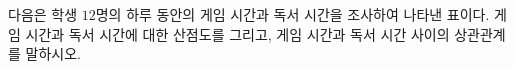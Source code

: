다음은 학생 $12$명의 하루 동안의 게임 시간과 독서 시간을 조사하여 나타낸 표이다. 게임 시간과 독서 시간에 대한 산점도를 그리고, 게임 시간과 독서 시간 사이의 상관관계를 말하시오.
\par\smallskip\begin{center}\resizebox{\ifdim\width>\linewidth\linewidth\else\width\fi}{!}{}\end{center}
